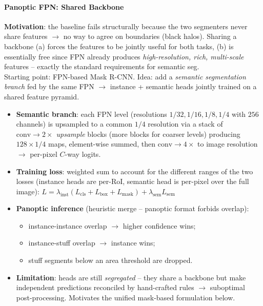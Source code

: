 \documentclass{article}
\begin{document}
\paragraph{Panoptic FPN: Shared Backbone}
\textbf{Motivation}: the baseline fails structurally because the two segmenters never share features $\rightarrow$ no way to agree on boundaries (black halos). Sharing a backbone (a) forces the features to be jointly useful for both tasks, (b) is essentially free since FPN already produces \textit{high-resolution, rich, multi-scale} features -- exactly the standard requirements for semantic seg.\\
Starting point: FPN-based Mask R-CNN. Idea: add a \textit{semantic segmentation branch} fed by the same FPN $\rightarrow$ instance + semantic heads jointly trained on a shared feature pyramid.
\begin{itemize}
    \item \textbf{Semantic branch}: each FPN level (resolutions $1/32, 1/16, 1/8, 1/4$ with $256$ channels) is upsampled to a common $1/4$ resolution via a stack of \textit{$\text{conv}\to 2\times$ upsample} blocks (more blocks for coarser levels) producing $128 \times 1/4$ maps, element-wise summed, then $\text{conv}\to 4\times$ to image resolution $\rightarrow$ per-pixel $C$-way logits.
    \item \textbf{Training loss}: weighted sum to account for the different ranges of the two losses (instance heads are per-RoI, semantic head is per-pixel over the full image):
    $L = \lambda_\text{inst}(L_\text{cls} + L_\text{box} + L_\text{mask}) + \lambda_\text{sem} L_\text{sem}$
    \item \textbf{Panoptic inference} (heuristic merge -- panoptic format forbids overlap):
    \begin{itemize}
        \item instance-instance overlap $\rightarrow$ higher confidence wins;
        \item instance-stuff overlap $\rightarrow$ instance wins;
        \item stuff segments below an area threshold are dropped.
    \end{itemize}
    \item \textbf{Limitation}: heads are still \textit{segregated} -- they share a backbone but make independent predictions reconciled by hand-crafted rules $\rightarrow$ suboptimal post-processing. Motivates the unified mask-based formulation below.
\end{itemize}
\end{document}
